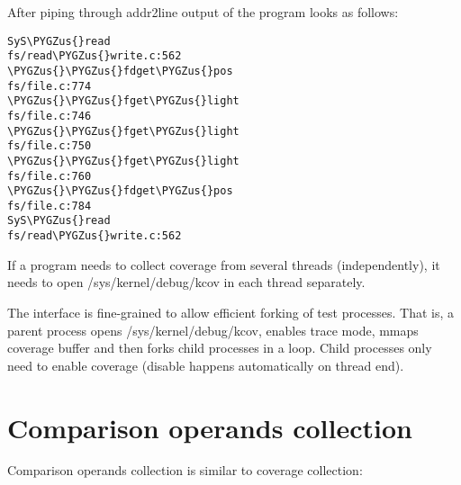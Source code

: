 \documentclass[a4paper,8pt,english]{sphinxmanual}
\def\PYGZus{\char`\_}
\begin{document}
After piping through addr2line output of the program looks as follows:

\begin{Verbatim}[commandchars=\\\{\}]
SyS\PYGZus{}read
fs/read\PYGZus{}write.c:562
\PYGZus{}\PYGZus{}fdget\PYGZus{}pos
fs/file.c:774
\PYGZus{}\PYGZus{}fget\PYGZus{}light
fs/file.c:746
\PYGZus{}\PYGZus{}fget\PYGZus{}light
fs/file.c:750
\PYGZus{}\PYGZus{}fget\PYGZus{}light
fs/file.c:760
\PYGZus{}\PYGZus{}fdget\PYGZus{}pos
fs/file.c:784
SyS\PYGZus{}read
fs/read\PYGZus{}write.c:562
\end{Verbatim}

If a program needs to collect coverage from several threads (independently),
it needs to open /sys/kernel/debug/kcov in each thread separately.

The interface is fine-grained to allow efficient forking of test processes.
That is, a parent process opens /sys/kernel/debug/kcov, enables trace mode,
mmaps coverage buffer and then forks child processes in a loop. Child processes
only need to enable coverage (disable happens automatically on thread end).


\section{Comparison operands collection}
\label{dev-tools/kcov:comparison-operands-collection}
Comparison operands collection is similar to coverage collection:
\end{document}
